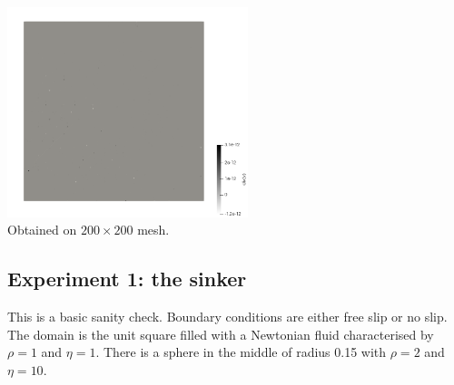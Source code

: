 \begin{center}
\includegraphics[width=7cm]{python_codes/fieldstone_158/results/exp4/divv}\\
{\captionfont Obtained on $200\times 200$ mesh.}
\end{center} 



\newpage
\subsection*{Experiment 1: the sinker}

This is a basic sanity check. Boundary conditions are either free slip or no slip.
The domain is the unit square filled with a Newtonian fluid characterised by 
$\rho=1$ and $\eta=1$. There is a sphere in the middle of radius 0.15 with $\rho=2$
and $\eta=10$.


